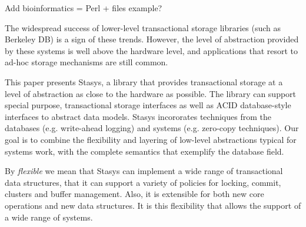\documentclass[letterpaper,twocolumn,10pt]{article}
\newcommand{\yad}{Stasys\xspace}
\newcommand{\eat}[1]{}
\begin{document}
Add bioinformatics = Perl + files example?

\eat{
Examples of real world systems that currently fall into this category
are web search engines, document repositories, large-scale web-email
services, map and trip planning services, ticket reservation systems,
photo and video repositories, bioinformatics, version control systems,
workflow applications, CAD/VLSI applications and directory services.

In short, we believe that a fundamental architectural shift in
transactional storage is necessary before general purpose storage
systems are of practical use to modern applications.
Until this change occurs, databases' imposition of unwanted
abstraction upon their users will restrict system designs and
implementations.
}

%

The widespread success of lower-level transactional storage libraries
(such as Berkeley DB) is a sign of these trends.  However, the level
of abstraction provided by these systems is well above the hardware
level, and applications that resort to ad-hoc storage mechanisms are
still common.

This paper presents \yad, a library that provides transactional
storage at a level of abstraction as close to the hardware as
possible.  The library can support special purpose, transactional
storage interfaces as well as ACID database-style interfaces to
abstract data models.  \yad incororates techniques from the databases
(e.g. write-ahead logging) and systems (e.g. zero-copy techniques).
Our goal is to combine the flexibility and layering of low-level
abstractions typical for systems work, with the complete semantics
that exemplify the database field.

By {\em flexible} we mean that \yad{}  can implement a wide
range of transactional data structures, that it can support a variety
of policies for locking, commit, clusters and buffer management.
Also, it is extensible for both new core operations
and new data structures. It is this flexibility that allows the
support of a wide range of systems.
\end{document}
